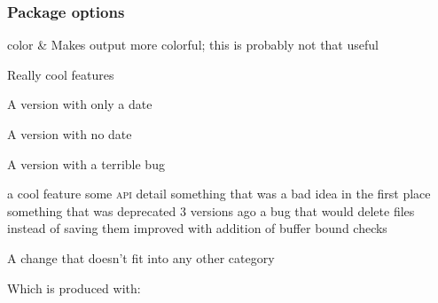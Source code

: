 \documentclass{ltxdoc}
\begin{document}
\subsubsection{Package options}

\begin{Optionlist}
	color & Makes output more colorful; this is probably not that useful
\end{Optionlist}

\begin{changelog}[author=Rebecca Turner,
	sectioncmd=\subsection,
	title=Example changelog]
\begin{version}
	\added Really cool features
\end{version}

\begin{version}[date=2019-01-23]
	\item A version with only a date
\end{version}

\begin{version}[v=1.1.0]
	\item A version with no date
\end{version}

\begin{version}[v=1.0.1, yanked]
	\item A version with a terrible bug
\end{version}

\begin{version}[v=1.0.0, date=2018-10-26]
	\added a cool feature
	\changed some \textsc{api} detail
	\deprecated something that was a bad idea in the first place
	\removed something that was deprecated 3 versions ago
	\fixed a bug that would delete files instead of saving them
	\security improved with addition of buffer bound checks
	\item A change that doesn't fit into any other category
\end{version}
\end{changelog}

Which is produced with:
\end{document}
